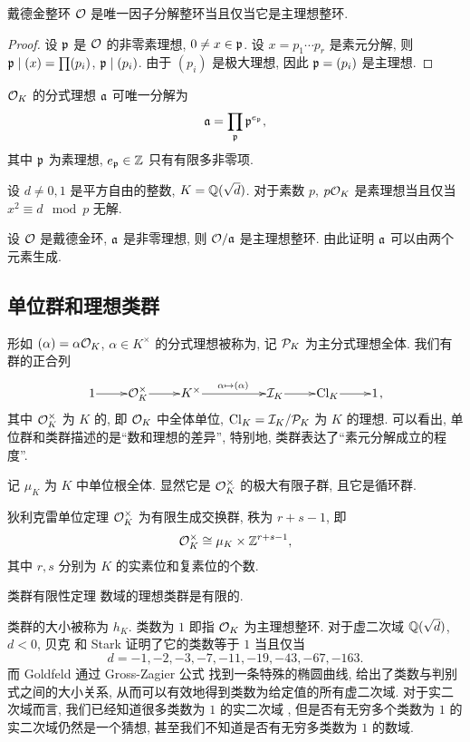 \begin{corollary}{}{}
戴德金整环 ${\mathcal{O}}$ 是唯一因子分解整环当且仅当它是主理想整环.
\end{corollary}
\begin{proof}
设 ${\mathfrak{p}}$ 是 ${\mathcal{O}}$ 的非零素理想, $0\neq x\in{\mathfrak{p}}$. 设 $x=p_1\cdots p_r$ 是素元分解, 则 ${\mathfrak{p}}\mid (x)=\prod (p_i)$, ${\mathfrak{p}}\mid(p_i)$. 由于 $(p_i)$ 是极大理想, 因此 ${\mathfrak{p}}=(p_i)$ 是主理想.
\end{proof}

\begin{corollary}{}{}
${\mathcal{O}}_K$ 的分式理想 ${\mathfrak{a}}$ 可唯一分解为
  \[{\mathfrak{a}}=\prod_{{\mathfrak{p}}}{\mathfrak{p}}^{e_{\mathfrak{p}}},\]
其中 ${\mathfrak{p}}$ 为素理想, $e_{\mathfrak{p}}\in{\mathbb{Z}}$ 只有有限多非零项.
\end{corollary}

\begin{exercise}
设 $d\neq 0,1$ 是平方自由的整数, $K={\mathbb{Q}}(\sqrt{d})$. 对于素数 $p$, $p{\mathcal{O}}_K$ 是素理想当且仅当 $x^2\equiv d\mod p$ 无解.
\end{exercise}

\begin{exercise}
设 ${\mathcal{O}}$ 是戴德金环, ${\mathfrak{a}}$ 是非零理想, 则 ${\mathcal{O}}/{\mathfrak{a}}$ 是主理想整环. 由此证明 ${\mathfrak{a}}$ 可以由两个元素生成.
\end{exercise}

\subsection{单位群和理想类群}
形如 $(\alpha)=\alpha{\mathcal{O}}_K$, $\alpha\in K^\times$ 的分式理想被称为, 记 ${\mathcal{P}}_K$ 为主分式理想全体. 我们有群的正合列
  \[\xymatrix@1{
1\ar[r] &\CO_K^\times\ar[r] &K^\times \ar[rr]^{\alpha\mapsto (\alpha)} &&\CI_K\ar[r] &\Cl_K\ar[r] &1
},\]
其中 ${\mathcal{O}}_K^\times$ 为 $K$ 的, 即 ${\mathcal{O}}_K$ 中全体单位, ${\mathrm{Cl}}_K={\mathcal{I}}_K/{\mathcal{P}}_K$ 为 $K$ 的理想. 
可以看出, 单位群和类群描述的是``数和理想的差异'', 特别地, 类群表达了``素元分解成立的程度''. 

记 $\mu_K$ 为 $K$ 中单位根全体. 显然它是 ${\mathcal{O}}_K^\times$ 的极大有限子群, 且它是循环群. 
\begin{theorem}{狄利克雷单位定理}{}
${\mathcal{O}}_K^\times$ 为有限生成交换群, 秩为 $r+s-1$, 即
  \[{\mathcal{O}}_K^\times\cong \mu_K\times {\mathbb{Z}}^{r+s-1},\]
其中 $r,s$ 分别为 $K$ 的实素位和复素位的个数.
\end{theorem}

\begin{theorem}{类群有限性定理}{}
数域的理想类群是有限的.
\end{theorem}
类群的大小被称为 $h_K$. 类数为 $1$ 即指 ${\mathcal{O}}_K$ 为主理想整环. 对于虚二次域 ${\mathbb{Q}}(\sqrt{d})$, $d<0$, 贝克 \cite[I]{Baker1966} 和 Stark \cite{Stark1967} 证明了它的类数等于 $1$ 当且仅当
  \[d=-1,-2,-3,-7,-11,-19,-43,-67,-163.\]
而 Goldfeld \cite{Goldfeld1985} 通过 Gross-Zagier 公式 \cite{GrossZagier1986} 找到一条特殊的椭圆曲线, 给出了类数与判别式之间的大小关系, 从而可以有效地得到类数为给定值的所有虚二次域.
对于实二次域而言, 我们已经知道很多类数为 $1$ 的实二次域 \cite{MollinWilliams1991}, 但是否有无穷多个类数为 $1$ 的实二次域仍然是一个猜想, 甚至我们不知道是否有无穷多类数为 $1$ 的数域.

